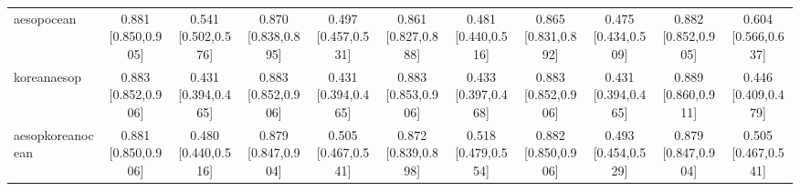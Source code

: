 \documentclass[10pt]{article}
\begin{document}
\begin{landscape}
\begin{longtable}{@{}l*{10}{c}@{}}
aesopocean & \shortstack{0.881\\{}[0.850,0.905]} & \shortstack{0.541\\{}[0.502,0.576]} & \shortstack{0.870\\{}[0.838,0.895]} & \shortstack{0.497\\{}[0.457,0.531]} & \shortstack{0.861\\{}[0.827,0.888]} & \shortstack{0.481\\{}[0.440,0.516]} & \shortstack{0.865\\{}[0.831,0.892]} & \shortstack{0.475\\{}[0.434,0.509]} & \shortstack{0.882\\{}[0.852,0.905]} & \shortstack{0.604\\{}[0.566,0.637]}\\
koreanaesop & \shortstack{0.883\\{}[0.852,0.906]} & \shortstack{0.431\\{}[0.394,0.465]} & \shortstack{0.883\\{}[0.852,0.906]} & \shortstack{0.431\\{}[0.394,0.465]} & \shortstack{0.883\\{}[0.853,0.906]} & \shortstack{0.433\\{}[0.397,0.468]} & \shortstack{0.883\\{}[0.852,0.906]} & \shortstack{0.431\\{}[0.394,0.465]} & \shortstack{0.889\\{}[0.860,0.911]} & \shortstack{0.446\\{}[0.409,0.479]}\\
aesopkoreanocean & \shortstack{0.881\\{}[0.850,0.906]} & \shortstack{0.480\\{}[0.440,0.516]} & \shortstack{0.879\\{}[0.847,0.904]} & \shortstack{0.505\\{}[0.467,0.541]} & \shortstack{0.872\\{}[0.839,0.898]} & \shortstack{0.518\\{}[0.479,0.554]} & \shortstack{0.882\\{}[0.850,0.906]} & \shortstack{0.493\\{}[0.454,0.529]} & \shortstack{0.879\\{}[0.847,0.904]} & \shortstack{0.505\\{}[0.467,0.541]}\\
\midrule
\end{longtable}
\endgroup\end{landscape}
\end{document}
